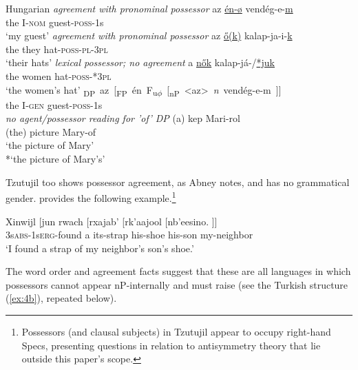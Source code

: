\documentclass[output=paper
,modfonts
,nonflat]{langsci/langscibook}
\begin{document}
\begin{exe}
	\ex Hungarian \citep[90]{Szabolcsi1983} \label{ex:16}
	\xlist
		\ex \label{ex:16a}\textit{agreement with pronominal possessor} \newline
	\gll az   \underline{én-ø} vendég-e-\underline{m}\\
	the I-\textsc{nom} guest-\textsc{poss}{}-1s\\
	\glt `my guest'  	
		\ex \label{ex:16b}\textit{agreement with pronominal possessor} \newline
	\gll az   \underline{\H{o}(k)}  kalap-ja-i-\underline{k}\\
	the they hat-\textsc{poss}{}-\textsc{pl}{}-\textsc{3pl}\\
	\glt `their hats'
		\ex \label{ex:16c}\textit{lexical possessor; no agreement}\newline
	\gll  a   \underline{n\H{o}k}       kalap-já-/\underline{*juk}\\
	the   women hat-\textsc{poss}{}-*\textsc{3pl}\\
	\glt `the women's hat' 
		\ex \label{ex:16d}
	\gll \mbox{{\lbrack}\textsubscript{DP} az [\textsubscript{FP} én    F\textsubscript{u}\textsubscript{$\phi$} [\textsubscript{nP} <az> \textit{n} vendég-e-m ]]{\rbrack}}\\
	\hspace{0.6cm}the      \hspace{-5.4cm}I-\textsc{gen}                     \hspace{-2.7cm}guest-\textsc{poss}-1s\\
		\ex \label{ex:16e}\textit{no agent/possessor reading for 'of' DP} \newline
	\gll (a) kep       Mari-rol\\
(the) picture Mary-of\\
	\glt `the picture of Mary'\\ {*}`the picture of Mary's'
	\endxlist
\end{exe}
Tzutujil too shows possessor agreement, as Abney notes, and has no grammatical gender. \citet[286]{Dayley1985} provides the following example.\footnote{Possessors (and clausal subjects) in Tzutujil appear to occupy right-hand Specs, presenting questions in relation to antisymmetry theory \citep{Kayne1994} that lie outside this paper’s scope.} 

\begin{exe}
	\ex 
	\gll Xinwijl [jun rwach [rxajab' [rk'aajool [nb'eesino. ]]{\rbrack}\\
	3s\textsc{abs}-1s\textsc{erg}-found     \hspace{0.1cm}a     its-strap    \hspace{0.1cm}his-shoe      \hspace{0.1cm}his-son    \hspace{0.1cm}my-neighbor\\
	\glt `I found a strap of my neighbor's son's shoe.'  	
\end{exe}
The word order and agreement facts suggest that these are all languages in which possessors cannot appear nP-internally and must raise (see the Turkish structure (\ref{ex:4b}), repeated below). 
\end{document}
